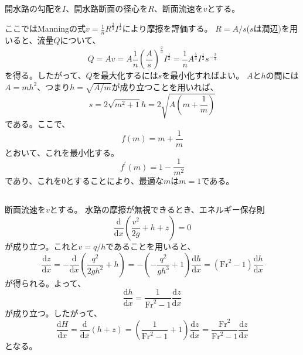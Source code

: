 \documentclass[a4paper]{jsarticle}
\begin{document}
\subsection{}
開水路の勾配を$I$、開水路断面の径心を$R$、断面流速を$v$とする。\par
ここではManningの式$v = \frac{1}{n} R^{\frac{2}{3}}  I^{\frac{1}{2}}$により摩擦を評価する。
$R = A/s$($s$は潤辺)を用いると、流量$Q$について、
\begin{equation}
  Q = A v = A \frac{1}{n} \left(\frac{A}{s}\right)^{\frac{2}{3}} I^{\frac{1}{2}}
  = \frac{1}{n} A^{\frac{5}{3}} I^{\frac{1}{2}} s^{-\frac{2}{3}}
\end{equation}
を得る。したがって、$Q$を最大化するには$s$を最小化すればよい。
$A$と$h$の間には$A = mh^2$、つまり$h = \sqrt{A/m}$が成り立つことを用いれば、
\begin{equation}
  s = 2 \sqrt{m^2 + 1} h = 2 \sqrt{A \left(m + \frac{1}{m}\right)}
\end{equation}
である。ここで、
\begin{equation}
  f(m) = m + \frac{1}{m}
\end{equation}
とおいて、これを最小化する。
\begin{equation}
  f^{\prime}(m) = 1 - \frac{1}{m^2}
\end{equation}
であり、これを0とすることにより、最適な$m$は$m = 1$である。

\subsection{}
\subsubsection{}
断面流速を$v$とする。
水路の摩擦が無視できるとき、エネルギー保存則
\begin{equation}
  \frac{\mathrm{d}}{\mathrm{d} x} \left(\frac{v^2}{2g} + h + z\right) = 0
\end{equation}
が成り立つ。これと$v = q/h$であることを用いると、
\begin{equation}
  \frac{\mathrm{d} z}{\mathrm{d} x}
  = -\frac{\mathrm{d}}{\mathrm{d} x} \left(\frac{q^2}{2g h^2} + h\right)
  = -\left(-\frac{q^2}{gh^3} + 1\right) \frac{\mathrm{d} h}{\mathrm{d} x}
  = \left(\mathrm{Fr}^2 - 1\right) \frac{\mathrm{d} h}{\mathrm{d} x}
\end{equation}
が得られる。よって、
\begin{equation}
  \frac{\mathrm{d} h}{\mathrm{d} x} = \frac{1}{\mathrm{Fr}^2 - 1} \frac{\mathrm{d} z}{\mathrm{d} x}
\end{equation}
が成り立つ。したがって、
\begin{equation}
  \frac{\mathrm{d} H}{\mathrm{d} x} = \frac{\mathrm{d}}{\mathrm{d} x} (h + z)
  = \left(\frac{1}{\mathrm{Fr}^2 - 1} + 1\right) \frac{\mathrm{d} z}{\mathrm{d} x}
  = \frac{\mathrm{Fr}^2}{\mathrm{Fr}^2 - 1} \frac{\mathrm{d} z}{\mathrm{d} x}
\end{equation}
となる。
\end{document}

